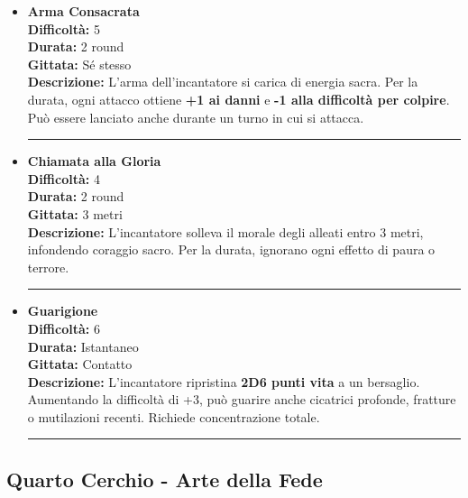 \documentclass[../manuale_main.tex]{subfiles}
\begin{document}
\begin{itemize}

\item \textbf{Arma Consacrata} \\
\textbf{Difficoltà:} 5 \\
\textbf{Durata:} 2 round \\
\textbf{Gittata:} Sé stesso \\
\textbf{Descrizione:} L’arma dell’incantatore si carica di energia sacra. Per la durata, ogni attacco ottiene \textbf{+1 ai danni} e \textbf{-1 alla difficoltà per colpire}. Può essere lanciato anche durante un turno in cui si attacca.

\vspace{0.5cm}\rule{\textwidth}{0.4pt}\vspace{1cm}

\item \textbf{Chiamata alla Gloria} \\
\textbf{Difficoltà:} 4 \\
\textbf{Durata:} 2 round \\
\textbf{Gittata:} 3 metri \\
\textbf{Descrizione:} L’incantatore solleva il morale degli alleati entro 3 metri, infondendo coraggio sacro. Per la durata, ignorano ogni effetto di paura o terrore.

\vspace{0.5cm}\rule{\textwidth}{0.4pt}\vspace{1cm}

\item \textbf{Guarigione} \\
\textbf{Difficoltà:} 6 \\
\textbf{Durata:} Istantaneo \\
\textbf{Gittata:} Contatto \\
\textbf{Descrizione:} L’incantatore ripristina \textbf{2D6 punti vita} a un bersaglio. Aumentando la difficoltà di +3, può guarire anche cicatrici profonde, fratture o mutilazioni recenti. Richiede concentrazione totale.

\vspace{0.5cm}\rule{\textwidth}{0.4pt}\vspace{1cm}


\end{itemize}

\clearpage
 \subsection*{Quarto Cerchio - Arte della Fede}
\end{document}
